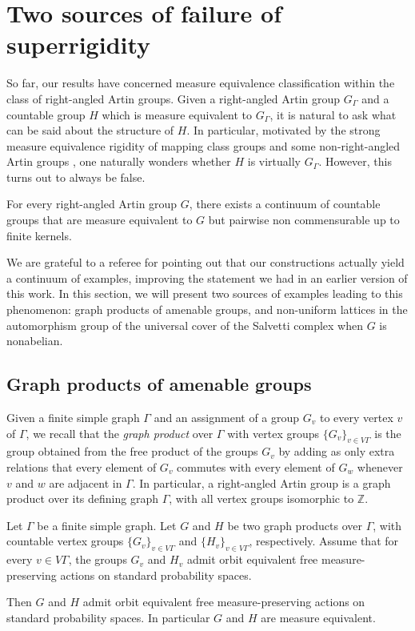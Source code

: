 \section{Two sources of failure of superrigidity}

So far, our results have concerned measure equivalence classification within the class of right-angled Artin groups. Given a right-angled Artin group $G_\Gamma$ and a countable group $H$ which is measure equivalent to $G_\Gamma$, it is natural to ask what can be said about the structure of $H$. In particular, motivated by the strong measure equivalence rigidity of mapping class groups \cite{Kid} and some non-right-angled Artin groups \cite{HH}, one naturally wonders whether $H$ is virtually $G_\Gamma$. However, this turns out to always be false.

\begin{theo}\label{theo:non-rigidity}
For every right-angled Artin group $G$, there exists a continuum of countable groups that are measure equivalent to $G$ but pairwise non commensurable up to finite kernels.
\end{theo}

We are grateful to a referee for pointing out that our constructions actually yield a continuum of examples, improving the statement we had in an earlier version of this work. In this section, we will present two sources of examples leading to this phenomenon: graph products of amenable groups, and non-uniform lattices in the automorphism group of the universal cover of the Salvetti complex when $G$ is nonabelian.

\subsection{Graph products of amenable groups}

Given a finite simple graph $\Gamma$ and an assignment of a group $G_v$ to every vertex $v$ of $\Gamma$, we recall that the \emph{graph product} over $\Gamma$ with vertex groups $\{G_v\}_{v\in V\Gamma}$ is the group obtained from the free product of the groups $G_v$ by adding as only extra relations that every element of $G_v$ commutes with every element of $G_w$ whenever $v$ and $w$ are adjacent in $\Gamma$. In particular, a right-angled Artin group is a graph product over its defining graph $\Gamma$, with all vertex groups isomorphic to $\mathbb{Z}$.

\begin{prop}\label{prop:graph-product}
Let $\Gamma$ be a finite simple graph. Let $G$ and $H$ be two graph products over $\Gamma$, with countable vertex groups $\{G_v\}_{v\in V\Gamma}$ and $\{H_v\}_{v\in V\Gamma}$, respectively. Assume that for every $v\in V\Gamma$, the groups $G_v$ and $H_v$ admit orbit equivalent free measure-preserving actions on standard probability spaces.

Then $G$ and $H$ admit orbit equivalent free measure-preserving actions on standard probability spaces. In particular $G$ and $H$ are measure equivalent.
\end{prop}

